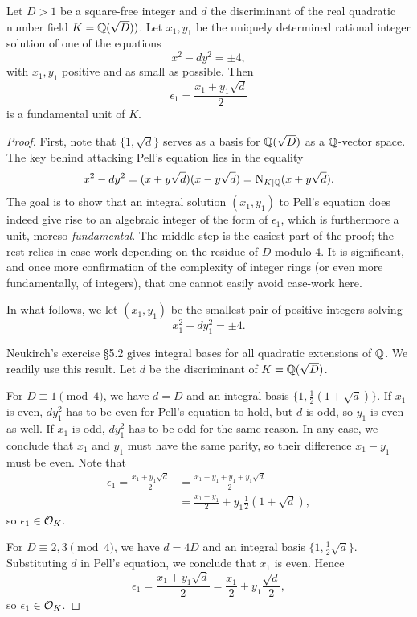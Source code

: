 \begin{prop}
	Let $D>1$ be a square-free integer and $d$ the discriminant of the real quadratic number field $K=\mathbb{Q}(\sqrt{D}))$. Let $x_1,y_1$ be the uniquely determined rational integer solution of one of the equations
	\[
		x^2-dy^2=\pm 4,
	\]
	with $x_1,y_1$ positive and as small as possible. Then
	\[
		\epsilon_1 = \frac{x_1+y_1\sqrt{d}}{2}
	\]
	is a fundamental unit of $K$.
\end{prop}
\begin{proof}
	First, note that $\{1,\sqrt{d}\}$ serves as a basis for $\mathbb{Q}(\sqrt{D})$ as a $\mathbb{Q}$-vector space. The key behind attacking Pell's equation lies in the equality
	\[
		x^2-dy^2 = (x+y\sqrt{d})(x-y\sqrt{d}) = \operatorname{N}_{K\mid\mathbb{Q}}(x+y\sqrt{d}).
	\]
	The goal is to show that an integral solution $(x_1,y_1)$ to Pell's equation does indeed give rise to an algebraic integer of the form of $\epsilon_1$, which is furthermore a unit, moreso \emph{fundamental}. The middle step is the easiest part of the proof; the rest relies in case-work depending on the residue of $D$ modulo 4. It is significant, and once more confirmation of the complexity of integer rings (or even more fundamentally, of integers), that one cannot easily avoid case-work here.

	In what follows, we let $(x_1,y_1)$ be the smallest pair of positive integers solving
	\[
		x_1^2-dy_1^2 = \pm 4.
	\]

	Neukirch's exercise \S 5.2 gives integral bases for all quadratic extensions of $\mathbb{Q}$. We readily use this result. Let $d$ be the discriminant of $K=\mathbb{Q}(\sqrt{D})$.

	For $D\equiv 1 \pmod{4}$, we have $d=D$ and an integral basis $\{1,\frac{1}{2}(1+\sqrt{d})\}$. If $x_1$ is even, $dy_1^2$ has to be even for Pell's equation to hold, but $d$ is odd, so $y_1$ is even as well. If $x_1$ is odd, $dy_1^2$ has to be odd for the same reason. In any case, we conclude that $x_1$ and $y_1$ must have the same parity, so their difference $x_1-y_1$ must be even. Note that
	\begin{align*}
		\epsilon_1 = \frac{x_1+y_1\sqrt{d}}{2} &= \frac{x_1-y_1+y_1+y_1\sqrt{d}}{2}\\
			&= \frac{x_1-y_1}{2} + y_1\frac{1}{2}\left(1+\sqrt{d}\right),
	\end{align*}
	so $\epsilon_1\in\mathcal{O}_K$.

	For $D\equiv 2,3 \pmod{4}$, we have $d=4D$ and an integral basis $\{1,\frac{1}{2}\sqrt{d}\}$. Substituting $d$ in Pell's equation, we conclude that $x_1$ is even. Hence
	\[
		\epsilon_1 = \frac{x_1+y_1\sqrt{d}}{2} = \frac{x_1}{2} + y_1\frac{\sqrt{d}}{2},
	\]
	so $\epsilon_1\in\mathcal{O}_K$.


\end{proof}
